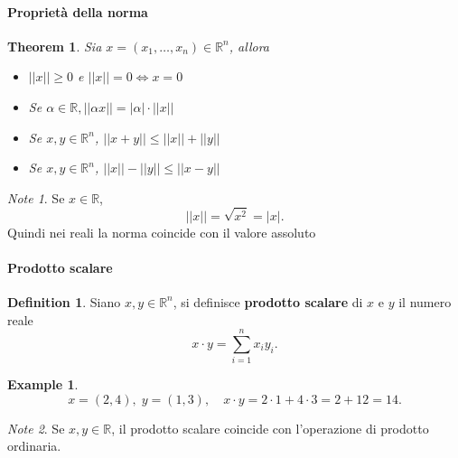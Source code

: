 \documentclass{article}
\theoremstyle{plain}
\newtheorem{thm}{Theorem}[section]
\theoremstyle{definition}
\newtheorem{defn}{Definition}[section]
\newtheorem{exmp}{Example}[section]
\theoremstyle{remark}
\newtheorem{note}{Note}
\begin{document}
\vspace{10pt}

\paragraph{Proprietà della norma}
\begin{bxthm}
\begin{thm}
    Sia $x=(x_1,\ldots,x_n)\in\mathbb{R}^n$, allora
    \begin{itemize}
        \item $||x||\geq0$ e $||x||=0 \iff x=0$
        \item Se $\alpha\in\mathbb{R}, ||\alpha x||=|\alpha|\cdot||x||$
        \item Se $x,y\in\mathbb{R}^n$, $||x+y||\leq||x||+||y||$
        \item Se $x,y\in\mathbb{R}^n$, $||x||-||y||\leq||x-y||$
    \end{itemize}
\end{thm}
\end{bxthm}

\vspace{10pt}

\begin{note}
    Se $x\in\mathbb{R}$, \[||x||=\sqrt{x^2}=|x|.\]
    Quindi nei reali la norma coincide con il valore assoluto
\end{note}

\vspace{10pt}

\paragraph{Prodotto scalare}
\begin{bxthm}
\begin{defn}
    Siano $x,y\in\mathbb{R}^n$, si definisce \textbf{prodotto scalare} di $x$ e $y$ il numero reale 
    \[x\cdot y=\sum_{i=1}^{n}x_iy_i.\]
\end{defn}
\end{bxthm}

\vspace{10pt}

\begin{exmp}
    \[x=(2,4),\;y=(1,3),\quad x\cdot y=2\cdot1+4\cdot3=2+12=14.\]
\end{exmp}

\vspace{10pt}

\begin{note}
    Se $x,y\in\mathbb{R}$, il prodotto scalare coincide con l'operazione di prodotto ordinaria. 
\end{note}
\end{document}
